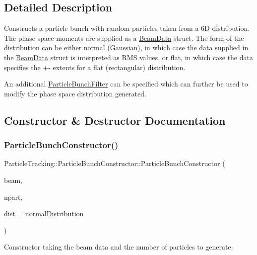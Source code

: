 \subsection{Detailed Description}
Constructs a particle bunch with random particles taken from a 6D distribution. The phase space moments are supplied as a \hyperlink{classBeamData}{Beam\+Data} struct. The form of the distribution can be either normal (Gaussian), in which case the data supplied in the \hyperlink{classBeamData}{Beam\+Data} struct is interpreted as R\+MS values, or flat, in which case the data specifies the +-\/ extents for a flat (rectangular) distribution.

An additional \hyperlink{classParticleTracking_1_1ParticleBunchFilter}{Particle\+Bunch\+Filter} can be specified which can further be used to modify the phase space distribution generated. 

\subsection{Constructor \& Destructor Documentation}
\mbox{\label{classParticleTracking_1_1ParticleBunchConstructor_a645edb6f56ea4bfb61ad75185a924050}} 
\subsubsection{\texorpdfstring{Particle\+Bunch\+Constructor()}{ParticleBunchConstructor()}}
{\footnotesize\ttfamily Particle\+Tracking\+::\+Particle\+Bunch\+Constructor\+::\+Particle\+Bunch\+Constructor (\begin{DoxyParamCaption}\item[{const \hyperlink{classBeamData}{Beam\+Data} \&}]{beam,  }\item[{size\+\_\+t}]{npart,  }\item[{Distribution\+Type}]{dist = {\ttfamily normalDistribution} }\end{DoxyParamCaption})}

Constructor taking the beam data and the number of particles to generate. 

